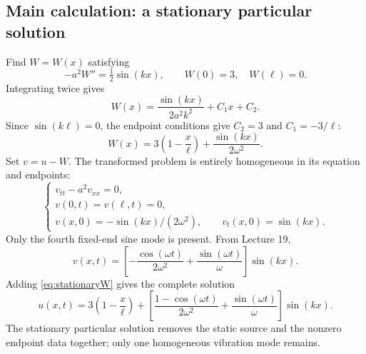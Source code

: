 \documentclass[11pt,a4paper]{article}
\begin{document}
\subsection{Main calculation: a stationary particular solution}
Find $W=W(x)$ satisfying
\begin{equation}
 -a^2W''=\tfrac12\sin(kx),\qquad W(0)=3,\quad W(\ell)=0.
\end{equation}
Integrating twice gives
\begin{equation}
 W(x)=\frac{\sin(kx)}{2a^2k^2}+C_1x+C_2.
\end{equation}
Since $\sin(k\ell)=0$, the endpoint conditions give $C_2=3$ and $C_1=-3/\ell$:
\begin{equation}\label{eq:stationaryW}
 \boxed{W(x)=3\left(1-\frac x\ell\right)+\frac{\sin(kx)}{2\omega^2}.}
\end{equation}
Set $v=u-W$. The transformed problem is entirely homogeneous in its equation
and endpoints:
\begin{equation}
 \begin{cases}
 v_{tt}-a^2v_{xx}=0,\\
 v(0,t)=v(\ell,t)=0,\\
 v(x,0)=-\sin(kx)/(2\omega^2),\qquad v_t(x,0)=\sin(kx).
 \end{cases}
\end{equation}
Only the fourth fixed-end sine mode is present. From Lecture 19,
\begin{equation}
 v(x,t)=\left[-\frac{\cos(\omega t)}{2\omega^2}
                  +\frac{\sin(\omega t)}\omega\right]\sin(kx).
\end{equation}
Adding \eqref{eq:stationaryW} gives the complete solution
\begin{equation}\label{eq:exampleanswer}
 \boxed{u(x,t)=3\left(1-\frac x\ell\right)
       +\left[\frac{1-\cos(\omega t)}{2\omega^2}
                  +\frac{\sin(\omega t)}\omega\right]\sin(kx).}
\end{equation}
The stationary particular solution removes the static source and the nonzero
endpoint data together; only one homogeneous vibration mode remains.
\end{document}
